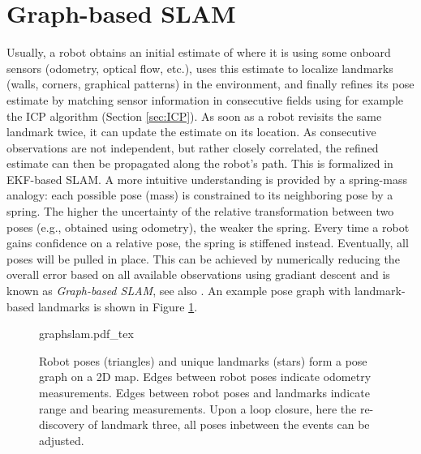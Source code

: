 \section{Graph-based SLAM}
Usually, a robot obtains an initial estimate of where it is using some onboard sensors (odometry, optical flow, etc.), uses this estimate to localize landmarks (walls, corners, graphical patterns) in the environment, and finally refines its pose estimate by matching sensor information in consecutive fields using for example the ICP algorithm (Section \ref{sec:ICP}). As soon as a robot revisits the same landmark twice, it can update the estimate on its location. As consecutive observations are not independent, but rather closely correlated, the refined estimate can then be propagated along the robot's path. This is formalized in EKF-based SLAM. A more intuitive understanding is provided by a spring-mass analogy: each possible pose (mass) is constrained to its neighboring pose by a spring. The higher the uncertainty of the relative transformation between two poses (e.g., obtained using odometry), the weaker the spring. Every time a robot gains confidence on a relative pose, the spring is stiffened instead. Eventually, all poses will be pulled in place. This can be achieved by numerically reducing the overall error based on all available observations using gradiant descent and is known as \emph{Graph-based SLAM}, see also \cite{grisetti2010tutorial}. An example pose graph with landmark-based landmarks is shown in Figure \ref{fig:graphslam}.

\begin{figure}
\centering
    \def\svgwidth{\textwidth}
    {graphslam.pdf_tex}
    \caption{Robot poses (triangles) and unique landmarks (stars) form a pose graph on a 2D map. Edges between robot poses indicate odometry measurements. Edges between robot poses and landmarks indicate range and bearing measurements. Upon a loop closure, here the re-discovery of landmark three, all poses inbetween the events can be adjusted. }\label{fig:graphslam}
\end{figure}

